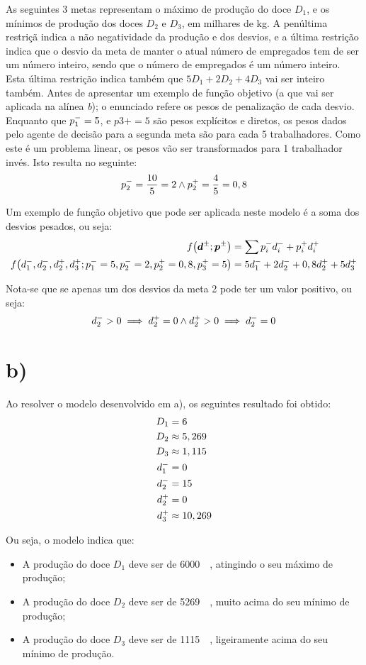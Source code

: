 As seguintes 3 metas representam o máximo de produção do doce $D_1$, e os mínimos de produção dos doces $D_2$ e $D_3$, em milhares de \unit{\kilogram}. A penúltima restriçã indica a não negatividade da produção e dos desvios, e a última restrição indica que o desvio da meta de manter o atual número de empregados tem de ser um número inteiro, sendo que o número de empregados é um número inteiro. Esta última restrição indica também que $5D_1 + 2D_2 + 4D_3$ vai ser inteiro também. 
Antes de apresentar um exemplo de função objetivo (a que vai ser aplicada na alínea \textit{b}); %
o enunciado refere os pesos de penalização de cada desvio. Enquanto que $p_{1}^{-} = 5$, e $p3+ = 5$ são pesos explícitos e diretos, os pesos dados pelo agente de decisão para a segunda meta são para cada 5 trabalhadores. Como este é um problema linear, os pesos vão ser transformados para 1 trabalhador invés. Isto resulta no seguinte:
$$
p_{2}^{-} = \frac{10}{5} = 2 \land p_{2}^{+} = \frac{4}{5} = 0,8
$$

Um exemplo de função objetivo que pode ser aplicada neste modelo é a soma dos desvios pesados, ou seja:
\begin{align*}
f\left(\mathbold{d^\pm}; \mathbold{p^\pm}\right) &= \sum{p_i^-d_i^- + p_i^+d_i^+} \\
f\left(\d1-, \d2-, \d2+, \d3+; \p1-=5, \p2-=2, \p2+=0,8, \p3+=5\right) &= 5\d1- + 2\d2- + 0,8\d2+ + 5\d3+
\end{align*}

Nota-se que se apenas um dos desvios da meta 2 pode ter um valor positivo, ou seja: 
$$
d_{2}^{-} > 0 \implies  d_{2}^{+} = 0 \land d_{2}^{+} > 0 \implies d_{2}^{-} = 0
$$
\section{b)}
Ao resolver o modelo desenvolvido em a), os seguintes resultado foi obtido:
\begin{align*}
  D_1  &=       6     \\
  D_2  &\approx 5,269 \\
  D_3  &\approx 1,115 \\
  d_{1}^{-} &=       0     \\
  d_{2}^{-} &=       15    \\
  d_{2}^{+} &=       0     \\
  d_{3}^{+} &\approx 10,269\\
\end{align*}

Ou seja, o modelo indica que:
\begin{itemize}
  \item A produção do doce $D_1$ deve ser de \qty{6000}{\kilo\grams}, atingindo o seu máximo de produção;
  \item A produção do doce $D_2$ deve ser de \qty{5269}{\kilo\grams}, muito acima do seu mínimo de produção;
  \item A produção do doce $D_3$ deve ser de \qty{1115}{\kilo\grams}, ligeiramente acima do seu mínimo de produção.
\end{itemize}


